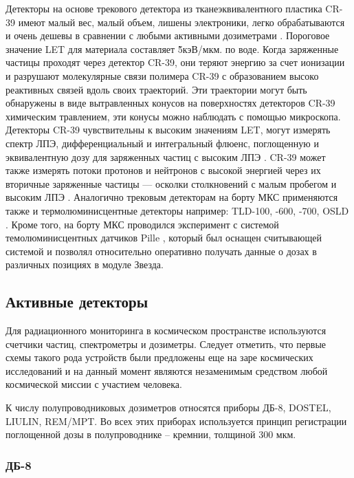 Детекторы на основе трекового детектора из  тканеэквивалентного пластика CR-39 имеют малый вес, малый объем, лишены электроники, легко обрабатываются и очень дешевы в сравнении с любыми активными дозиметрами \cite{Zhou2008}. 
Пороговое значение LET для материала составляет \~ 5кэВ/мкм. по воде.
Когда заряженные частицы проходят через детектор CR-39,
они теряют энергию за счет ионизации и разрушают молекулярные связи полимера CR-39 с образованием высоко реактивных связей вдоль своих траекторий. Эти траектории могут быть обнаружены в виде вытравленных конусов на поверхностях детекторов CR-39 химическим травлением, эти конусы можно наблюдать с помощью микроскопа. Детекторы CR-39 чувствительны к высоким значениям LET,
могут измерять спектр ЛПЭ, дифференциальный и интегральный флюенс, поглощенную  и эквивалентную дозу для заряженных частиц с высоким ЛПЭ \cite{Zhou2008}. CR-39 может также измерять потоки протонов и нейтронов с высокой энергией через их вторичные заряженные частицы --- осколки столкновений с малым пробегом и высоким ЛПЭ \cite{Zhou2008}. 
Аналогично трековым детекторам на борту МКС применяются также и термолюминисцентные детекторы например: TLD-100, -600, -700, OSLD  \cite{Zhou2010}. Кроме того, на борту МКС проводился эксперимент с системой темолюминисцентных датчиков Pille \cite{Apathy2007}, который был оснащен считывающей системой и позволял относительно оперативно получать данные о дозах в различных позициях в модуле Звезда.

\subsection{Активные детекторы} \label{subsect1_3_2}

Для радиационного мониторинга в космическом пространстве используются счетчики частиц, спектрометры и дозиметры. Следует отметить, что первые схемы такого рода устройств были предложены еще на заре космических исследований \cite{Markelov1982,Markelov1978} и на данный момент являются незаменимым средством любой космической миссии с участием человека.

К числу полупроводниковых дозиметров относятся приборы ДБ-8, DOSTEL, LIULIN, REM/MPT. Во всех этих приборах используется принцип регистрации поглощенной дозы в полупроводнике – кремнии, толщиной 300 мкм.  

\subsubsection{ДБ-8}

